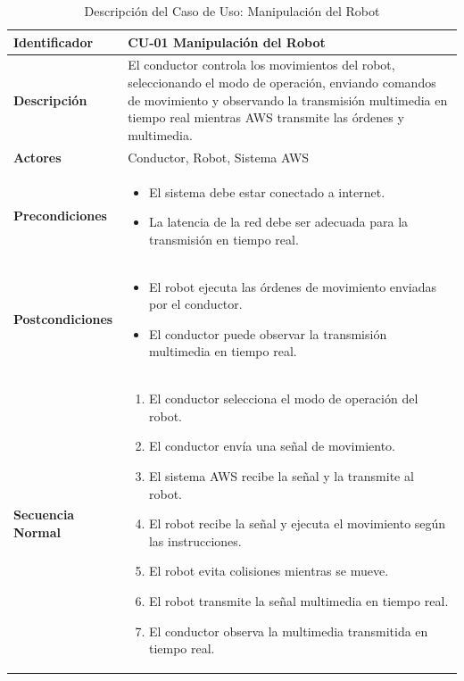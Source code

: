         \begin{longtable}{|p{4cm}|p{10cm}|}
        \caption{Descripci\'on del Caso de Uso: Manipulaci\'on del Robot} \label{tab:casosdesc} \\
        \hline
        \textbf{Identificador}     & CU-01 Manipulaci\'on del Robot \\ \hline
        \textbf{Descripci\'on}       & El conductor controla los movimientos del robot, seleccionando el modo de operaci\'on, enviando comandos de movimiento y observando la transmisi\'on multimedia en tiempo real mientras AWS transmite las \'ordenes y multimedia. \\ \hline
        \textbf{Actores}           & Conductor, Robot, Sistema AWS \\ \hline
        \textbf{Precondiciones}    & 
        \begin{itemize}
            \item El sistema debe estar conectado a internet.
            \item La latencia de la red debe ser adecuada para la transmisi\'on en tiempo real.
        \end{itemize} \\ \hline
        \textbf{Postcondiciones}   & 
        \begin{itemize}
            \item El robot ejecuta las \'ordenes de movimiento enviadas por el conductor.
            \item El conductor puede observar la transmisi\'on multimedia en tiempo real.
        \end{itemize} \\ \hline
        \textbf{Secuencia Normal}  & 
        \begin{enumerate}
            \item El conductor selecciona el modo de operaci\'on del robot.
            \item El conductor env\'ia una se\~nal de movimiento.
            \item El sistema AWS recibe la se\~nal y la transmite al robot.
            \item El robot recibe la se\~nal y ejecuta el movimiento seg\'un las instrucciones.
            \item El robot evita colisiones mientras se mueve.
            \item El robot transmite la se\~nal multimedia en tiempo real.
            \item El conductor observa la multimedia transmitida en tiempo real.

\end{enumerate}
\end{longtable}
